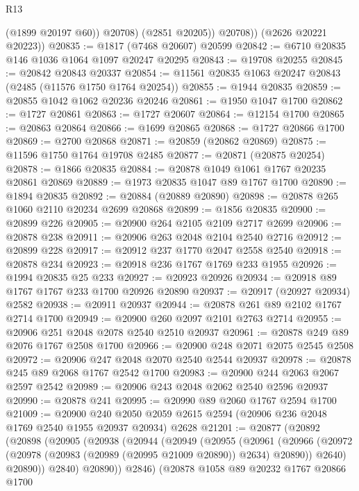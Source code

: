 \begin{lexlean}{R13}
\begin{coremodule}
                (@1899 @20197 @60))
              @20708)
            (@2851 @20205))
          @20708))
      (@2626 @20221 @20223))
@20835 := @1817 (@7468 @20607) @20599
@20842 := @6710 @20835 @146 @1036 @1064 @1097 @20247 @20295
@20843 := @19708 @20255
@20845 := @20842 @20843 @20337
@20854 := @11561 @20835 @1063 @20247 @20843 (@2485 (@11576 @1750 @1764 @20254))
@20855 := @1944 @20835
@20859 := @20855 @1042 @1062 @20236 @20246
@20861 := @1950 @1047 @1700
@20862 := @1727 @20861
@20863 := @1727 @20607
@20864 := @12154 @1700
@20865 := @20863 @20864
@20866 := @1699 @20865
@20868 := @1727 @20866 @1700
@20869 := @2700 @20868
@20871 := @20859 (@20862 @20869)
@20875 := @11596 @1750 @1764 @19708 @2485
@20877 := @20871 (@20875 @20254)
@20878 := @1866 @20835
@20884 := @20878 @1049 @1061 @1767 @20235 @20861 @20869
@20889 := @1973 @20835 @1047 @89 @1767 @1700
@20890 := @1894 @20835
@20892 := @20884 (@20889 @20890)
@20898 := @20878 @265 @1060 @2110 @20234 @2699 @20868
@20899 := @1856 @20835
@20900 := @20899 @226
@20905 := @20900 @264 @2105 @2109 @2717 @2699
@20906 := @20878 @238
@20911 := @20906 @263 @2048 @2104 @2540 @2716
@20912 := @20899 @228
@20917 := @20912 @237 @1770 @2047 @2558 @2540
@20918 := @20878 @234
@20923 := @20918 @236 @1767 @1769 @233 @1955
@20926 := @1994 @20835 @25 @233
@20927 := @20923 @20926
@20934 := @20918 @89 @1767 @1767 @233 @1700 @20926 @20890
@20937 := @20917 (@20927 @20934) @2582
@20938 := @20911 @20937
@20944 := @20878 @261 @89 @2102 @1767 @2714 @1700
@20949 := @20900 @260 @2097 @2101 @2763 @2714
@20955 := @20906 @251 @2048 @2078 @2540 @2510 @20937
@20961 := @20878 @249 @89 @2076 @1767 @2508 @1700
@20966 := @20900 @248 @2071 @2075 @2545 @2508
@20972 := @20906 @247 @2048 @2070 @2540 @2544 @20937
@20978 := @20878 @245 @89 @2068 @1767 @2542 @1700
@20983 := @20900 @244 @2063 @2067 @2597 @2542
@20989 := @20906 @243 @2048 @2062 @2540 @2596 @20937
@20990 := @20878 @241
@20995 := @20990 @89 @2060 @1767 @2594 @1700
@21009 := @20900
    @240
    @2050
    @2059
    @2615
    @2594
    (@20906 @236 @2048 @1769 @2540 @1955 @20937 @20934)
    @2628
@21201 := @20877
    (@20892
      (@20898
        (@20905
          (@20938
            (@20944
              (@20949
                (@20955
                  (@20961
                    (@20966
                      (@20972 (@20978 (@20983 (@20989 (@20995 @21009 @20890)) @2634) @20890))
                      @2640)
                    @20890))
                @2840)
              @20890))
          @2846)
        (@20878
          @1058
          @89
          @20232
          @1767
          @20866
          @1700

\end{coremodule}
\end{lexlean}
